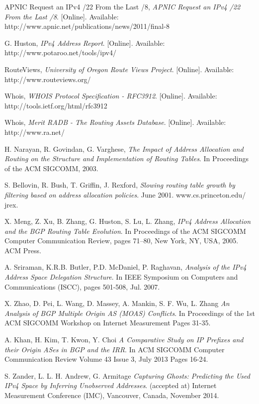 \documentclass[11pt,a4paper]{scrreprt}
\begin{document}
\begin{thebibliography}{count}
	APNIC Request an IPv4 /22 From the Last /8,
	\emph{APNIC Request an IPv4 /22 From the Last /8}.
	[Online]. Available: http://www.apnic.net/publications/news/2011/final-8
	
	G. Huston,
	\emph{IPv4 Address Report}.
	[Online]. Available: http://www.potaroo.net/tools/ipv4/

	RouteViews,
	\emph{University of Oregon Route Views Project}.
	[Online]. Available: http://www.routeviews.org/
	
	Whois,
	\emph{WHOIS Protocol Specification - RFC3912}.
	[Online]. Available: http://tools.ietf.org/html/rfc3912

	Whois,
	\emph{Merit RADB - The Routing Assets Database}.
	[Online]. Available: http://www.ra.net/

	H. Narayan, R. Govindan, G. Varghese,
	\emph{The Impact of Address Allocation and Routing on the Structure and Implementation of Routing Tables}.
	In Proceedings of the ACM SIGCOMM, 2003.
	
	S. Bellovin, R. Bush, T. Griffin, J. Rexford,
	\emph{Slowing routing table growth by filtering based on address allocation policies}.
	June 2001. www.cs.princeton.edu/ jrex.

	X. Meng, Z. Xu, B. Zhang, G. Huston, S. Lu, L. Zhang,
	\emph{IPv4 Address Allocation and the BGP Routing Table Evolution}.
	In Proceedings of the ACM SIGCOMM Computer Communication Review, pages 71–80, New York, NY, USA, 2005. ACM Press.

	A. Sriraman, K.R.B. Butler, P.D. McDaniel, P. Raghavan,
	\emph{Analysis of the IPv4 Address Space Delegation Structure}.
	In IEEE Symposium on Computers and Communications (ISCC), pages 501-508, Jul. 2007.
	
	X. Zhao, D. Pei, L. Wang, D. Massey, A. Mankin, S. F. Wu, L. Zhang
	\emph{An Analysis of BGP Multiple Origin AS (MOAS)
Conflicts}.
	In Proceedings of the 1st ACM SIGCOMM Workshop on Internet Measurement
Pages 31-35.
	
	A. Khan, H. Kim, T. Kwon, Y. Choi
	\emph{A Comparative Study on IP Prefixes and their Origin ASes
in BGP and the IRR}.
	In ACM SIGCOMM Computer Communication Review Volume 43 Issue 3, July 2013 Pages 16-24.
	
	S. Zander, L. L. H. Andrew, G. Armitage
	\emph{Capturing Ghosts: Predicting the Used IPv4 Space by Inferring Unobserved Addresses}.
	(accepted at) Internet Measurement Conference (IMC), Vancouver, Canada, November 2014.


\end{thebibliography}
\end{document}
